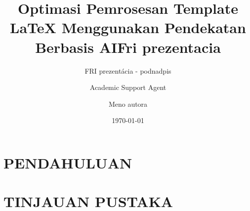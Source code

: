 \documentclass{beamer}
\title{Optimasi Pemrosesan Template LaTeX Menggunakan Pendekatan Berbasis AI}
\author{Academic Support Agent}
\date{\today}
\begin{document}
\maketitle

\begin{abstract}

\end{abstract}

\chapter{PENDAHULUAN}


\chapter{TINJAUAN PUSTAKA}


\usepackage[slovak]{babel}

\author{Meno autora}

\title{Fri prezentacia}

\subtitle{FRI prezentácia - podnadpis}


\end{document}

